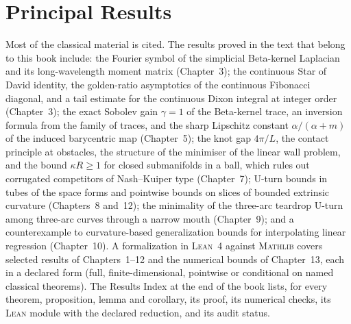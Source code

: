 \documentclass[11pt,a4paper,openright,twoside]{book}
\begin{document}
\section*{Principal Results}
Most of the classical material is cited. The results proved in the text that belong to this book include: the Fourier symbol of the simplicial Beta-kernel Laplacian and its long-wavelength moment matrix (Chapter~3); the continuous Star of David identity, the golden-ratio asymptotics of the continuous Fibonacci diagonal, and a tail estimate for the continuous Dixon integral at integer order (Chapter~3); the exact Sobolev gain $\gamma = 1$ of the Beta-kernel trace, an inversion formula from the family of traces, and the sharp Lipschitz constant $\alpha/(\alpha+m)$ of the induced barycentric map (Chapter~5); the knot gap $4\pi/L$, the contact principle at obstacles, the structure of the minimiser of the linear wall problem, and the bound $\kappa R \ge 1$ for closed submanifolds in a ball, which rules out corrugated competitors of Nash--Kuiper type (Chapter~7); U-turn bounds in tubes of the space forms and pointwise bounds on slices of bounded extrinsic curvature (Chapters~8 and~12); the minimality of the three-arc teardrop U-turn among three-arc curves through a narrow mouth (Chapter~9); and a counterexample to curvature-based generalization bounds for interpolating linear regression (Chapter~10). A formalization in \textsc{Lean}~4 against \textsc{Mathlib} covers selected results of Chapters~1--12 and the numerical bounds of Chapter~13, each in a declared form (full, finite-dimensional, pointwise or conditional on named classical theorems). The Results Index at the end of the book lists, for every theorem, proposition, lemma and corollary, its proof, its numerical checks, its \textsc{Lean} module with the declared reduction, and its audit status.
\end{document}
